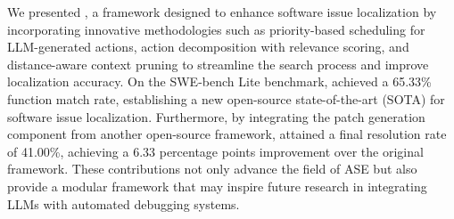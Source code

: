 We presented \nickname, a framework designed to enhance software issue localization by incorporating innovative methodologies such as priority-based scheduling for LLM-generated actions, action decomposition with relevance scoring, and distance-aware context pruning to streamline the search process and improve localization accuracy. On the SWE-bench Lite benchmark, \nickname achieved a 65.33\% function match rate, establishing a new open-source state-of-the-art (SOTA) for software issue localization. Furthermore, by integrating the patch generation component from another open-source framework, \nickname attained a final resolution rate of 41.00\%, achieving a 6.33 percentage points improvement over the original framework. These contributions not only advance the field of ASE but also provide a modular framework that may inspire future research in integrating LLMs with automated debugging systems.